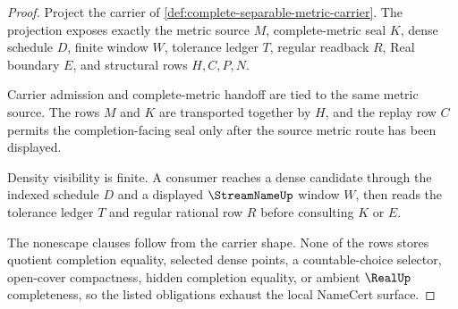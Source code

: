 \begin{proof}
Project the carrier of \autoref{def:complete-separable-metric-carrier}. The projection exposes exactly the metric source $M$, complete-metric seal $K$, dense schedule $D$, finite window $W$, tolerance ledger $T$, regular readback $R$, Real boundary $E$, and structural rows $H,C,P,N$.

Carrier admission and complete-metric handoff are tied to the same metric source. The rows $M$ and $K$ are transported together by $H$, and the replay row $C$ permits the completion-facing seal only after the source metric route has been displayed.

Density visibility is finite. A consumer reaches a dense candidate through the indexed schedule $D$ and a displayed $\StreamNameUp$ window $W$, then reads the tolerance ledger $T$ and regular rational row $R$ before consulting $K$ or $E$.

The nonescape clauses follow from the carrier shape. None of the rows stores quotient completion equality, selected dense points, a countable-choice selector, open-cover compactness, hidden completion equality, or ambient $\RealUp$ completeness, so the listed obligations exhaust the local NameCert surface.
\end{proof}

